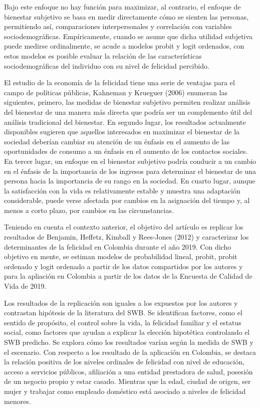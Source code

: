 \documentclass[12pt,spanish]{article}
\begin{document}
Bajo este enfoque no hay función para maximizar, al contrario, el enfoque de bienestar subjetivo se basa en medir directamente cómo se sienten las personas, permitiendo así, comparaciones interpersonales y correlación con variables sociodemográficas. Empíricamente, cuando se asume que dicha utilidad subjetiva puede medirse ordinalmente, se acude a modelos probit y logit ordenados, con estos modelos es posible evaluar la relación de las características sociodemográficas del individuo con su nivel de felicidad percibido. 

El estudio de la economía de la felicidad tiene una serie de ventajas para el campo de políticas públicas, Kahneman y Krueguer (2006) enumeran las siguientes, primero, las medidas de bienestar subjetivo permiten realizar análisis del bienestar de una manera más directa que podría ser un complemento útil del análisis tradicional del bienestar. En segundo lugar, los resultados actualmente disponibles sugieren que aquellos interesados en maximizar el bienestar de la sociedad deberían cambiar su atención de un énfasis en el aumento de las oportunidades de consumo a un énfasis en el aumento de los contactos sociales. En tercer lugar, un enfoque en el bienestar subjetivo podría conducir a un cambio en el énfasis de la importancia de los ingresos para determinar el bienestar de una persona hacia la importancia de su rango en la sociedad. En cuarto lugar, aunque la satisfacción con la vida es relativamente estable y muestra una adaptación considerable, puede verse afectada por cambios en la asignación del tiempo y, al menos a corto plazo, por cambios en las circunstancias.

Teniendo en cuenta el contexto anterior, el objetivo del artículo es replicar los resultados de Benjamin, Heffetz, Kimball y Rees-Jones (2012) y caracterizar los determinantes de la felicidad en Colombia durante el año 2019. Con dicho objetivo en mente, se estiman modelos de probabilidad lineal, probit, probit ordenado y logit ordenado a partir de los datos compartidos por los autores y para la apliación en Colombia a partir de los datos de la Encuesta de Calidad de Vida de 2019.  

Los resultados de la replicación son iguales a los expuestos por los autores y contrastan hipótesis de la literatura del SWB. Se identifican factores, como el sentido de propósito, el control sobre la vida, la felicidad familiar y el estatus social, como factores que ayudan a explicar la elección hipotética controlando el SWB predicho. Se explora cómo los resultados varían según la medida de SWB y el escenario. Con respecto a los resultado de la aplicación en Colombia, se destaca la relación positiva de los niveles ordinales de felicidad con nivel de educación, acceso a servicios públicos, afiliación a una entidad prestadora de salud, posesión de un negocio propio y estar casado. Mientras que la edad, ciudad de origen, ser mujer y trabajar como empleado doméstico está asociado a niveles de felicidad menores. 
\end{document}
